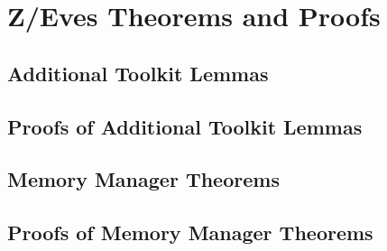 \documentclass[a4paper,10pt]{report}
\theoremstyle{definition}
\begin{document}
\chapter{Z/Eves Theorems and Proofs}
\label{zeves-proofs}

\section{Additional Toolkit Lemmas}
\label{additional-lemmas}
\normalsize

 

\section{Proofs of Additional Toolkit Lemmas}
\label{additional-lemmas-proofs}
\scriptsize





\section{Memory Manager Theorems}
\label{memory-manager-theorems}
\normalsize



\section{Proofs of Memory Manager Theorems}
\label{memory-manager-proofs}
\scriptsize


\end{document}
